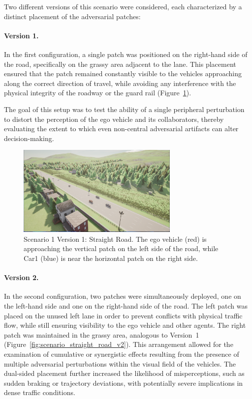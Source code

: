 Two different versions of this scenario were considered, each characterized by a distinct placement of the adversarial patches:

\paragraph{Version 1.}  
In the first configuration, a single patch was positioned on the right-hand side of the road, specifically on the grassy area adjacent to the lane.  
This placement ensured that the patch remained constantly visible to the vehicles approaching along the correct direction of travel, while avoiding any interference with the physical integrity of the roadway or the guard rail (Figure~\ref{fig:scenario_straight_road}).  

The goal of this setup was to test the ability of a single peripheral perturbation to distort the perception of the ego vehicle and its collaborators, thereby evaluating the extent to which even non-central adversarial artifacts can alter decision-making.

\begin{figure}[H]
    \centering
    \includegraphics[width=0.7\textwidth]{figures/experiments/scenario1_v1.png}
    \caption{Scenario 1 Version 1: Straight Road. The ego vehicle (red) is approaching the vertical patch on the left side of the road, while Car1 (blue) is near the horizontal patch on the right side.}
    \label{fig:scenario_straight_road}
\end{figure}

\paragraph{Version 2.}  
In the second configuration, two patches were simultaneously deployed, one on the left-hand side and one on the right-hand side of the road.  
The left patch was placed on the unused left lane in order to prevent conflicts with physical traffic flow, while still ensuring visibility to the ego vehicle and other agents. The right patch was maintained in the grassy area, analogous to Version~1 (Figure~\ref{fig:scenario_straight_road_v2}).  
This arrangement allowed for the examination of cumulative or synergistic effects resulting from the presence of multiple adversarial perturbations within the visual field of the vehicles. The dual-sided placement further increased the likelihood of misperceptions, such as sudden braking or trajectory deviations, with potentially severe implications in dense traffic conditions.

